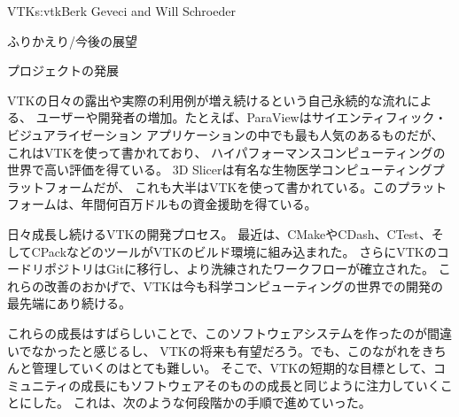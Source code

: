 \begin{aosachapter}{VTK}{s:vtk}{Berk Geveci and Will Schroeder}
\begin{aosasect1}{ふりかえり/今後の展望}
\begin{aosasect2}{プロジェクトの発展}
\begin{aosaitemize}
  \item VTKの日々の露出や実際の利用例が増え続けるという自己永続的な流れによる、
  ユーザーや開発者の増加。たとえば、ParaViewはサイエンティフィック・ビジュアライゼーション
  アプリケーションの中でも最も人気のあるものだが、これはVTKを使って書かれており、
  ハイパフォーマンスコンピューティングの世界で高い評価を得ている。
  3D Slicerは有名な生物医学コンピューティングプラットフォームだが、
  これも大半はVTKを使って書かれている。このプラットフォームは、年間何百万ドルもの資金援助を得ている。

  \item 日々成長し続けるVTKの開発プロセス。
  最近は、CMakeやCDash、CTest、そしてCPackなどのツールがVTKのビルド環境に組み込まれた。
  さらにVTKのコードリポジトリはGitに移行し、より洗練されたワークフローが確立された。
  これらの改善のおかげで、VTKは今も科学コンピューティングの世界での開発の最先端にあり続ける。

\end{aosaitemize}

これらの成長はすばらしいことで、このソフトウェアシステムを作ったのが間違いでなかったと感じるし、
VTKの将来も有望だろう。でも、このながれをきちんと管理していくのはとても難しい。
そこで、VTKの短期的な目標として、コミュニティの成長にもソフトウェアそのものの成長と同じように注力していくことにした。
これは、次のような何段階かの手順で進めていった。


\end{aosasect2}
\end{aosasect1}
\end{aosachapter}
